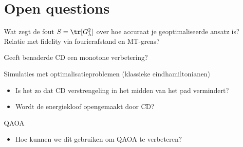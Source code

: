 \section{Open questions}
Wat zegt de fout $S = \tr[G_\lambda^2]$ over hoe accuraat je geoptimaliseerde ansatz is? Relatie met fidelity via fourierafstand en MT-grens?\par
Geeft benaderde CD een monotone verbetering?\par
Simulaties met optimalisatieproblemen (klassieke eindhamiltonianen)
\begin{itemize}
    \item Is het zo dat CD verstrengeling in het midden van het pad vermindert?
    \item Wordt de energiekloof opengemaakt door CD?
\end{itemize}
QAOA
\begin{itemize}
    \item Hoe kunnen we dit gebruiken om QAOA te verbeteren?
\end{itemize}



